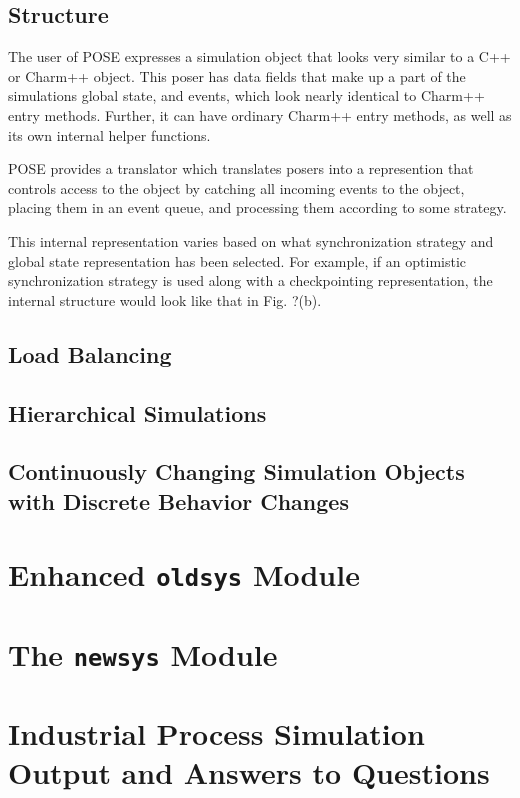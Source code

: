 \documentclass[10pt]{article}
\begin{document}
\subsection{Structure}

The user of POSE expresses a simulation object that looks very similar
to a C++ or Charm++ object.  This poser has data fields that make up a
part of the simulations global state, and events, which look nearly
identical to Charm++ entry methods.  Further, it can have ordinary
Charm++ entry methods, as well as its own internal helper functions.  

POSE provides a translator which translates posers into a represention
that controls access to the object by catching all incoming events to
the object, placing them in an event queue, and processing them
according to some strategy.

This internal representation varies based on what synchronization
strategy and global state representation has been selected.  For
example, if an optimistic synchronization strategy is used along with a
checkpointing representation, the internal structure would look like
that in Fig. ?(b).

\subsection{Load Balancing}

\subsection{Hierarchical Simulations}

\subsection{Continuously Changing Simulation Objects with Discrete
Behavior Changes}

\appendix

\section{Enhanced {\tt oldsys} Module}

\section{The {\tt newsys} Module}

\section{Industrial Process Simulation Output and Answers to Questions} 
\end{document}
